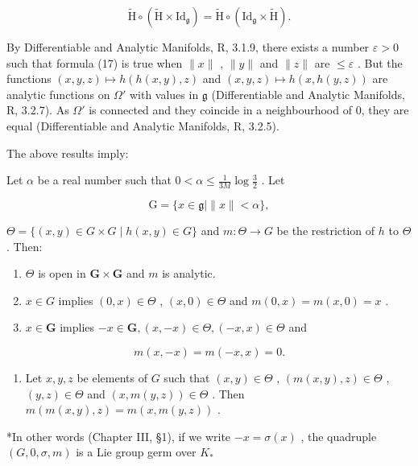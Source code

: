 \[
\tilde {\mathrm{H}} \circ (\tilde {\mathrm{H}} \times \mathrm{Id} _ {\mathfrak {g}}) = \tilde {\mathrm{H}} \circ (\mathrm{Id} _ {\mathfrak {g}} \times \tilde {\mathrm{H}}).
\]

By Differentiable and Analytic Manifolds, R, 3.1.9, there exists a number \(\varepsilon > 0\) such that formula (17) is true when \(\|x\|\) , \(\|y\|\) and \(\|z\|\) are \(\leqslant \varepsilon\) . But the functions \((x,y,z)\mapsto h(h(x,y),z)\) and \((x,y,z)\mapsto h(x,h(y,z))\) are analytic functions on \(\Omega'\) with values in \(\mathfrak{g}\) (Differentiable and Analytic Manifolds, R, 3.2.7). As \(\Omega'\) is connected and they coincide in a neighbourhood of 0, they are equal (Differentiable and Analytic Manifolds, R, 3.2.5).

The above results imply:

Let \(\alpha\) be a real number such that \(0 < \alpha \leqslant \frac{1}{3M} \log \frac{3}{2}\) . Let

\[
\mathrm{G} = \{x \in \mathfrak {g} \mid \| x \| <   \alpha \},
\]

\(\Theta = \{(x,y) \in G \times G \mid h(x,y) \in G\}\) and \(m: \Theta \to G\) be the restriction of \(h\) to \(\Theta\) . Then:

\begin{enumerate}
\def\labelenumi{(\arabic{enumi})}
\item
  \(\Theta\) is open in \(\mathbf{G} \times \mathbf{G}\) and \(m\) is analytic.
\item
  \(x \in G\) implies \((0, x) \in \Theta\) , \((x, 0) \in \Theta\) and \(m(0, x) = m(x, 0) = x\) .
\item
  \(x \in \mathbf{G}\) implies \(-x \in \mathbf{G}, (x, -x) \in \Theta, (-x, x) \in \Theta\) and
\end{enumerate}

\[
m (x, - x) = m (- x, x) = 0.
\]

\begin{enumerate}
\def\labelenumi{(\arabic{enumi})}
\setcounter{enumi}{3}
\tightlist
\item
  Let \(x, y, z\) be elements of \(G\) such that \((x, y) \in \Theta\) , \((m(x, y), z) \in \Theta\) , \((y, z) \in \Theta\) and \((x, m(y, z)) \in \Theta\) . Then \(m(m(x, y), z) = m(x, m(y, z))\) .
\end{enumerate}

*In other words (Chapter III, §1), if we write \(-x = \sigma(x)\) , the quadruple \((G, 0, \sigma, m)\) is a Lie group germ over \(K_*\)

